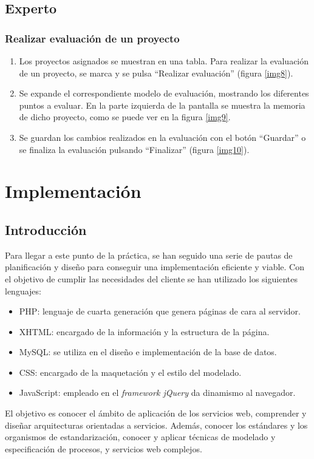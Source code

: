\documentclass[11pt,a4paper,spanish,twoside]{book}
\begin{document}
\section{Experto}
\subsection{Realizar evaluación de un proyecto}
\begin{enumerate}
\item Los proyectos asignados se muestran en una tabla. Para realizar la 
  evaluación de un proyecto, se marca y se pulsa ``Realizar evaluación''
  (figura \ref{img8}). 


\item Se expande el correspondiente modelo de evaluación, mostrando los 
  diferentes puntos a evaluar. En la parte izquierda de la pantalla se
  muestra la memoria de dicho proyecto, como se puede ver en la figura
  \ref{img9}. 


\item Se guardan los cambios realizados en la evaluación con el botón 
  ``Guardar'' o se finaliza la evaluación pulsando ``Finalizar'' (figura 
  \ref{img10}).
  
\end{enumerate}

\chapter{Implementación}
\section{Introducción}
Para llegar a este punto de la práctica, se han seguido una serie de pautas de
planificación y diseño para conseguir una implementación eficiente y viable.
Con el objetivo de cumplir las necesidades del cliente se han utilizado los
siguientes lenguajes:
\begin{itemize}
\item PHP\cite{achour}: lenguaje de cuarta generación que genera páginas de cara
al servidor.
\item XHTML\cite{wc}: encargado de la información y la estructura de la página.
\item MySQL: se utiliza en el diseño e implementación de la base de datos.
\item CSS\cite{wc}: encargado de la maquetación y el estilo del modelado.
\item JavaScript\cite{resig}: empleado en el \emph{framework jQuery} da 
dinamismo al navegador.
\end{itemize} 
El objetivo es conocer el ámbito de aplicación de los servicios web, comprender 
y diseñar arquitecturas orientadas a servicios. Además, conocer los estándares y
los organismos de estandarización, conocer y aplicar técnicas de modelado y 
especificación de procesos, y servicios web complejos.
\end{document}
